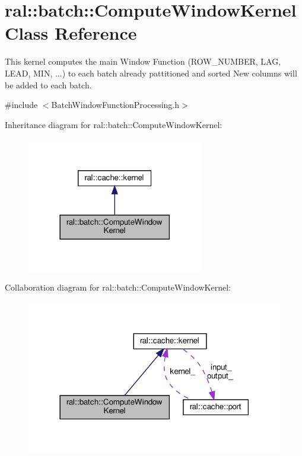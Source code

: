 \hypertarget{classral_1_1batch_1_1ComputeWindowKernel}{}\section{ral\+:\+:batch\+:\+:Compute\+Window\+Kernel Class Reference}
\label{classral_1_1batch_1_1ComputeWindowKernel}


This kernel computes the main Window Function (R\+O\+W\+\_\+\+N\+U\+M\+B\+ER, L\+AG, L\+E\+AD, M\+IN, ...) to each batch already pattitioned and sorted New columns will be added to each batch.  




{\ttfamily \#include $<$Batch\+Window\+Function\+Processing.\+h$>$}



Inheritance diagram for ral\+:\+:batch\+:\+:Compute\+Window\+Kernel\+:\nopagebreak
\begin{figure}[H]
\begin{center}
\leavevmode
\includegraphics[width=218pt]{classral_1_1batch_1_1ComputeWindowKernel__inherit__graph}
\end{center}
\end{figure}


Collaboration diagram for ral\+:\+:batch\+:\+:Compute\+Window\+Kernel\+:\nopagebreak
\begin{figure}[H]
\begin{center}
\leavevmode
\includegraphics[width=318pt]{classral_1_1batch_1_1ComputeWindowKernel__coll__graph}
\end{center}
\end{figure}
